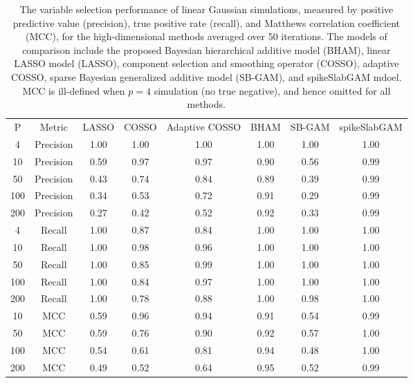 \begin{table}[ht]
\centering
\begin{tabular}{cccccccc}
 P & Metric & LASSO & COSSO & Adaptive COSSO & BHAM & SB-GAM & spikeSlabGAM \\ 
   4 & Precision & 1.00 & 1.00 & 1.00 & 1.00 & 1.00 & 1.00 \\ 
   10 & Precision & 0.59 & 0.97 & 0.97 & 0.90 & 0.56 & 0.99 \\ 
   50 & Precision & 0.43 & 0.74 & 0.84 & 0.89 & 0.39 & 0.99 \\ 
  100 & Precision & 0.34 & 0.53 & 0.72 & 0.91 & 0.29 & 0.99 \\ 
  200 & Precision & 0.27 & 0.42 & 0.52 & 0.92 & 0.33 & 0.99 \\ 
   \hline
  4 & Recall & 1.00 & 0.87 & 0.84 & 1.00 & 1.00 & 1.00 \\ 
   10 & Recall & 1.00 & 0.98 & 0.96 & 1.00 & 1.00 & 1.00 \\ 
   50 & Recall & 1.00 & 0.85 & 0.99 & 1.00 & 1.00 & 1.00 \\ 
  100 & Recall & 1.00 & 0.84 & 0.97 & 1.00 & 1.00 & 1.00 \\ 
  200 & Recall & 1.00 & 0.78 & 0.88 & 1.00 & 0.98 & 1.00 \\ 
   \hline
 10 & MCC & 0.59 & 0.96 & 0.94 & 0.91 & 0.54 & 0.99 \\ 
   50 & MCC & 0.59 & 0.76 & 0.90 & 0.92 & 0.57 & 1.00 \\ 
  100 & MCC & 0.54 & 0.61 & 0.81 & 0.94 & 0.48 & 1.00 \\ 
  200 & MCC & 0.49 & 0.52 & 0.64 & 0.95 & 0.52 & 0.99 \\ 
  \end{tabular}
\caption{The variable selection performance of linear Gaussian
                         simulations, measured by positive predictive value (precision),
                         true positive rate (recall), and Matthews correlation coefficient (MCC),
                         for the high-dimensional methods averaged over 50 iterations.
                         The models of comparison include the proposed Bayesian hierarchical additive model (BHAM),
                         linear LASSO model (LASSO), component selection and smoothing operator (COSSO),
                         adaptive COSSO, sparse Bayesian generalized additive model (SB-GAM), and spikeSlabGAM mdoel.
                         MCC is ill-defined when $p=4$ simulation (no true negative), and hence omitted for all methods.} 
\label{tab:sim_lnr_gaus_var_select}
\end{table}
